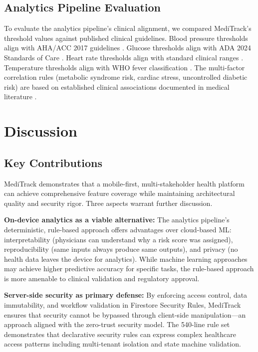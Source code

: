 \documentclass[journal,onecolumn,web]{ieeecolor}
\begin{document}
\subsection{Analytics Pipeline Evaluation}
To evaluate the analytics pipeline's clinical
alignment, we compared MediTrack's threshold values
against published clinical guidelines. Blood pressure
thresholds align with AHA/ACC 2017
guidelines \cite{whelton2018}. Glucose thresholds
align with ADA 2024 Standards of
Care \cite{ada2024}. Heart rate thresholds align with
standard clinical ranges \cite{perkins2021}.
Temperature thresholds align with WHO fever
classification \cite{who2014}. The multi-factor
correlation rules (metabolic syndrome risk, cardiac
stress, uncontrolled diabetic risk) are based on
established clinical associations documented in
medical literature \cite{grundy2004, cannon2007}.


\section{Discussion}
\label{sec:discussion}

\subsection{Key Contributions}
MediTrack demonstrates that a mobile-first,
multi-stakeholder health platform can achieve
comprehensive feature coverage while maintaining
architectural quality and security rigor. Three
aspects warrant further discussion.

{\bf On-device analytics as a viable alternative:}
The analytics pipeline's deterministic, rule-based
approach offers advantages over cloud-based ML:
interpretability (physicians can understand why a
risk score was assigned), reproducibility (same inputs
always produce same outputs), and privacy (no health
data leaves the device for analytics). While machine
learning approaches may achieve higher predictive
accuracy for specific tasks, the rule-based approach
is more amenable to clinical validation and regulatory
approval.

{\bf Server-side security as primary defense:} By
enforcing access control, data immutability, and
workflow validation in Firestore Security Rules,
MediTrack ensures that security cannot be bypassed
through client-side manipulation---an approach
aligned with the zero-trust security model. The
540-line rule set demonstrates that declarative
security rules can express complex healthcare access
patterns including multi-tenant isolation and state
machine validation.
\end{document}
